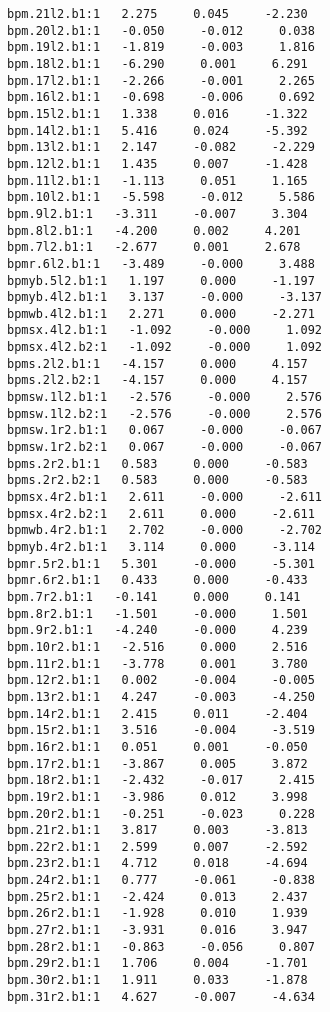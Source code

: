 \begin{verbatim}
bpm.21l2.b1:1   2.275     0.045     -2.230
bpm.20l2.b1:1   -0.050     -0.012     0.038
bpm.19l2.b1:1   -1.819     -0.003     1.816
bpm.18l2.b1:1   -6.290     0.001     6.291
bpm.17l2.b1:1   -2.266     -0.001     2.265
bpm.16l2.b1:1   -0.698     -0.006     0.692
bpm.15l2.b1:1   1.338     0.016     -1.322
bpm.14l2.b1:1   5.416     0.024     -5.392
bpm.13l2.b1:1   2.147     -0.082     -2.229
bpm.12l2.b1:1   1.435     0.007     -1.428
bpm.11l2.b1:1   -1.113     0.051     1.165
bpm.10l2.b1:1   -5.598     -0.012     5.586
bpm.9l2.b1:1   -3.311     -0.007     3.304
bpm.8l2.b1:1   -4.200     0.002     4.201
bpm.7l2.b1:1   -2.677     0.001     2.678
bpmr.6l2.b1:1   -3.489     -0.000     3.488
bpmyb.5l2.b1:1   1.197     0.000     -1.197
bpmyb.4l2.b1:1   3.137     -0.000     -3.137
bpmwb.4l2.b1:1   2.271     0.000     -2.271
bpmsx.4l2.b1:1   -1.092     -0.000     1.092
bpmsx.4l2.b2:1   -1.092     -0.000     1.092
bpms.2l2.b1:1   -4.157     0.000     4.157
bpms.2l2.b2:1   -4.157     0.000     4.157
bpmsw.1l2.b1:1   -2.576     -0.000     2.576
bpmsw.1l2.b2:1   -2.576     -0.000     2.576
bpmsw.1r2.b1:1   0.067     -0.000     -0.067
bpmsw.1r2.b2:1   0.067     -0.000     -0.067
bpms.2r2.b1:1   0.583     0.000     -0.583
bpms.2r2.b2:1   0.583     0.000     -0.583
bpmsx.4r2.b1:1   2.611     -0.000     -2.611
bpmsx.4r2.b2:1   2.611     0.000     -2.611
bpmwb.4r2.b1:1   2.702     -0.000     -2.702
bpmyb.4r2.b1:1   3.114     0.000     -3.114
bpmr.5r2.b1:1   5.301     -0.000     -5.301
bpmr.6r2.b1:1   0.433     0.000     -0.433
bpm.7r2.b1:1   -0.141     0.000     0.141
bpm.8r2.b1:1   -1.501     -0.000     1.501
bpm.9r2.b1:1   -4.240     -0.000     4.239
bpm.10r2.b1:1   -2.516     0.000     2.516
bpm.11r2.b1:1   -3.778     0.001     3.780
bpm.12r2.b1:1   0.002     -0.004     -0.005
bpm.13r2.b1:1   4.247     -0.003     -4.250
bpm.14r2.b1:1   2.415     0.011     -2.404
bpm.15r2.b1:1   3.516     -0.004     -3.519
bpm.16r2.b1:1   0.051     0.001     -0.050
bpm.17r2.b1:1   -3.867     0.005     3.872
bpm.18r2.b1:1   -2.432     -0.017     2.415
bpm.19r2.b1:1   -3.986     0.012     3.998
bpm.20r2.b1:1   -0.251     -0.023     0.228
bpm.21r2.b1:1   3.817     0.003     -3.813
bpm.22r2.b1:1   2.599     0.007     -2.592
bpm.23r2.b1:1   4.712     0.018     -4.694
bpm.24r2.b1:1   0.777     -0.061     -0.838
bpm.25r2.b1:1   -2.424     0.013     2.437
bpm.26r2.b1:1   -1.928     0.010     1.939
bpm.27r2.b1:1   -3.931     0.016     3.947
bpm.28r2.b1:1   -0.863     -0.056     0.807
bpm.29r2.b1:1   1.706     0.004     -1.701
bpm.30r2.b1:1   1.911     0.033     -1.878
bpm.31r2.b1:1   4.627     -0.007     -4.634

\end{verbatim}

